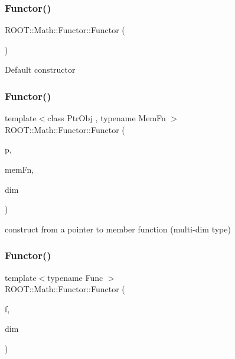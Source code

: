 \subsubsection{\texorpdfstring{Functor()}{Functor()}\hspace{0.1cm}{\footnotesize\ttfamily [5/12]}}
{\footnotesize\ttfamily R\+O\+O\+T\+::\+Math\+::\+Functor\+::\+Functor (\begin{DoxyParamCaption}{ }\end{DoxyParamCaption})\hspace{0.3cm}{\ttfamily [inline]}}

Default constructor \mbox{\label{classROOT_1_1Math_1_1Functor_ad6dbce8351bd8c74e6754215a3ccac41}} 
\subsubsection{\texorpdfstring{Functor()}{Functor()}\hspace{0.1cm}{\footnotesize\ttfamily [6/12]}}
{\footnotesize\ttfamily template$<$class Ptr\+Obj , typename Mem\+Fn $>$ \\
R\+O\+O\+T\+::\+Math\+::\+Functor\+::\+Functor (\begin{DoxyParamCaption}\item[{const Ptr\+Obj \&}]{p,  }\item[{Mem\+Fn}]{mem\+Fn,  }\item[{unsigned int}]{dim }\end{DoxyParamCaption})\hspace{0.3cm}{\ttfamily [inline]}}

construct from a pointer to member function (multi-\/dim type) \mbox{\label{classROOT_1_1Math_1_1Functor_a82af0df828055f18310af5d49dcc3aa2}} 
\subsubsection{\texorpdfstring{Functor()}{Functor()}\hspace{0.1cm}{\footnotesize\ttfamily [7/12]}}
{\footnotesize\ttfamily template$<$typename Func $>$ \\
R\+O\+O\+T\+::\+Math\+::\+Functor\+::\+Functor (\begin{DoxyParamCaption}\item[{const Func \&}]{f,  }\item[{unsigned int}]{dim }\end{DoxyParamCaption})\hspace{0.3cm}{\ttfamily [inline]}}

